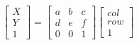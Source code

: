 \documentclass[preview]{standalone}
\begin{document}
\begin{align*}
\begin{bmatrix} X \\ Y \\ 1 \end{bmatrix} = \begin{bmatrix} a & b & c \\ d & e & f \\ 0 & 0 & 1 \end{bmatrix} \begin{bmatrix} col \\ row \\ 1 \end{bmatrix}
\end{align*}
\end{document}
